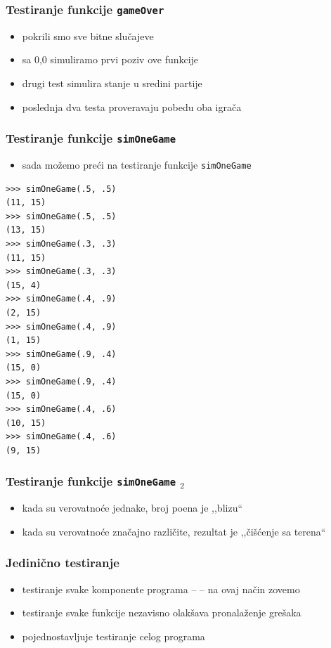 \documentclass[utf8,compress]{beamer}
\begin{document}
\begin{frame}
  \frametitle{Testiranje funkcije \texttt{gameOver}}
\begin{itemize}
  \item pokrili smo sve bitne slučajeve
  \item sa 0,0 simuliramo prvi poziv ove funkcije
  \item drugi test simulira stanje u sredini partije
  \item poslednja dva testa proveravaju pobedu oba igrača
\end{itemize}
\end{frame}

\begin{frame}[fragile,shrink=10]
  \frametitle{Testiranje funkcije \texttt{simOneGame}}
\begin{itemize}
  \item sada možemo preći na testiranje funkcije \texttt{simOneGame}
\end{itemize}
\begin{verbatim}
>>> simOneGame(.5, .5)
(11, 15)
>>> simOneGame(.5, .5)
(13, 15)
>>> simOneGame(.3, .3)
(11, 15)
>>> simOneGame(.3, .3)
(15, 4)
>>> simOneGame(.4, .9)
(2, 15)
>>> simOneGame(.4, .9)
(1, 15)
>>> simOneGame(.9, .4)
(15, 0)
>>> simOneGame(.9, .4)
(15, 0)
>>> simOneGame(.4, .6)
(10, 15)
>>> simOneGame(.4, .6)
(9, 15)
\end{verbatim}
\end{frame}

\begin{frame}
  \frametitle{Testiranje funkcije \texttt{simOneGame} $_2$}
\begin{itemize}
  \item kada su verovatnoće jednake, broj poena je ,,blizu``
  \item kada su verovatnoće značajno različite, rezultat je ,,čišćenje sa terena``
\end{itemize}
\end{frame}

\begin{frame}
  \frametitle{Jedinično testiranje}
\begin{itemize}
  \item testiranje svake komponente programa --  -- na ovaj način zovemo 
  \item testiranje svake funkcije nezavisno olakšava pronalaženje grešaka
  \item pojednostavljuje testiranje celog programa
\end{itemize}
\end{frame}
\end{document}

